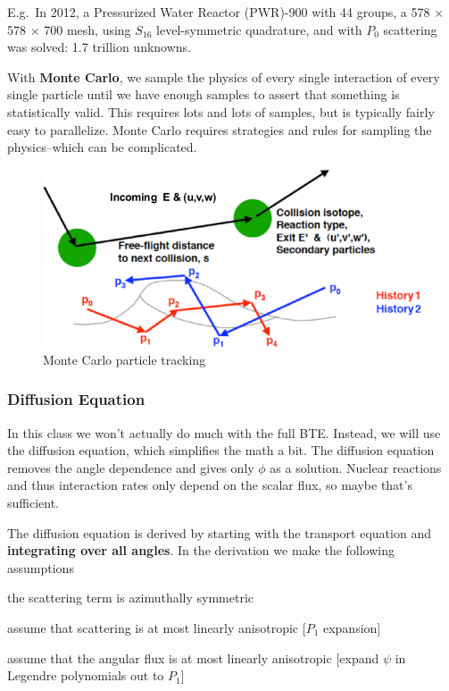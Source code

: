 \documentclass[12pt]{article}
\begin{document}
E.g.\ In 2012, a Pressurized Water Reactor (PWR)-900 with 44 groups, a 578 $\times$ 578 $\times$ 700 mesh, using $S_{16}$ level-symmetric quadrature, and with $P_{0}$ scattering was solved: 1.7 trillion unknowns.

With \textbf{Monte Carlo}, we sample the physics of every single interaction of every single particle until we have enough samples to assert that something is statistically valid. This requires lots and lots of samples, but is typically fairly easy to parallelize. Monte Carlo requires strategies and rules for sampling the physics--which can be complicated. 
\begin{figure}[h!]
    \begin{center}
    \includegraphics[keepaspectratio, width = 4 in]{../figs/MC}
    \end{center}
    \caption{Monte Carlo particle tracking}
    \label{fig:mc}
\end{figure}

\subsubsection*{Diffusion Equation}
In this class we won't actually do much with the full BTE.  Instead, we will use the diffusion equation, which simplifies the math a bit.
The diffusion equation removes the angle dependence and gives only $\phi$ as a solution. Nuclear reactions and thus interaction rates only depend on the scalar flux, so maybe that's sufficient.

The diffusion equation is derived by starting with the transport equation and \textbf{integrating over all angles}. In the derivation we make the following assumptions
\begin{compactitem}
\item the scattering term is azimuthally symmetric
\item assume that scattering is at most linearly anisotropic [$P_1$ expansion]
\item assume that the angular flux is at most linearly anisotropic [expand $\psi$ in Legendre polynomials out to $P_1$]
\end{compactitem} 
\end{document}
